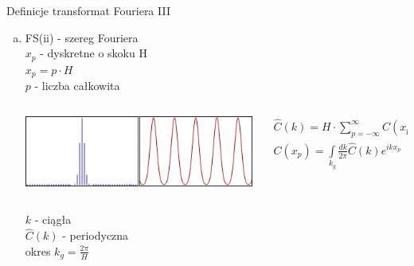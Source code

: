 \begin{frame}{Definicje transformat Fouriera III}
	\begin{enumerate}[c)]
		\item FS(ii) - szereg Fouriera \\
		$x_p$ - dyskretne o skoku H \\
		$x_p = p \cdot H$ \\
		$p$ - liczba całkowita
        \begin{columns}
            \begin{column}{0.35\textwidth}
                \includegraphics[width=\textwidth]{img/16/dtft_wykres1.png}
            \end{column}
            \begin{column}{0.65\textwidth}
                \begin{block}
                    \centering
                    \renewcommand{\arraystretch}{1.5}
                    \setlength{\abovedisplayskip}{0pt}
                    \setlength{\belowdisplayskip}{0pt}
                    \setlength{\abovedisplayshortskip}{0pt}
                    \setlength{\belowdisplayshortskip}{0pt}
                    \[
                        \begin{array}{c}
                            \widehat{C}(k) = H \cdot \sum\limits_{p = -\infty}^{\infty} C(x_p) e^{-ikx_p} \\
                            C(x_p) = \int\limits_{k_g} \frac{dk}{2 \pi} \widehat{C}(k) e^{ikx_p}
                        \end{array}
                        \tag{16.3}
                    \]
                \end{block}
            \end{column}
        \end{columns}
		$k$ - ciągła \\
		$\widehat{C}(k)$ - periodyczna \\
		okres $k_g = \frac{2 \pi}{H}$
	\end{enumerate}
\end{frame}
